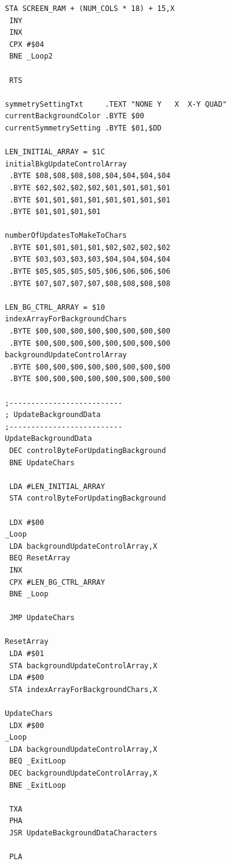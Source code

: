 \begin{minipage}[b]{0.33\linewidth}
\begin{lrbox}{\mybox}%
\begin{lstlisting}[basicstyle=\ttfamily\tiny]
 STA SCREEN_RAM + (NUM_COLS * 18) + 15,X
 INY 
 INX 
 CPX #$04
 BNE _Loop2

 RTS 

symmetrySettingTxt     .TEXT "NONE Y   X  X-Y QUAD"
currentBackgroundColor .BYTE $00
currentSymmetrySetting .BYTE $01,$DD

LEN_INITIAL_ARRAY = $1C
initialBkgUpdateControlArray   
 .BYTE $08,$08,$08,$08,$04,$04,$04,$04
 .BYTE $02,$02,$02,$02,$01,$01,$01,$01
 .BYTE $01,$01,$01,$01,$01,$01,$01,$01
 .BYTE $01,$01,$01,$01

numberOfUpdatesToMakeToChars   
 .BYTE $01,$01,$01,$01,$02,$02,$02,$02
 .BYTE $03,$03,$03,$03,$04,$04,$04,$04
 .BYTE $05,$05,$05,$05,$06,$06,$06,$06
 .BYTE $07,$07,$07,$07,$08,$08,$08,$08

LEN_BG_CTRL_ARRAY = $10
indexArrayForBackgroundChars   
 .BYTE $00,$00,$00,$00,$00,$00,$00,$00
 .BYTE $00,$00,$00,$00,$00,$00,$00,$00
backgroundUpdateControlArray   
 .BYTE $00,$00,$00,$00,$00,$00,$00,$00
 .BYTE $00,$00,$00,$00,$00,$00,$00,$00

;--------------------------
; UpdateBackgroundData
;--------------------------
UpdateBackgroundData
 DEC controlByteForUpdatingBackground
 BNE UpdateChars

 LDA #LEN_INITIAL_ARRAY
 STA controlByteForUpdatingBackground

 LDX #$00
_Loop
 LDA backgroundUpdateControlArray,X
 BEQ ResetArray
 INX 
 CPX #LEN_BG_CTRL_ARRAY
 BNE _Loop

 JMP UpdateChars

ResetArray
 LDA #$01
 STA backgroundUpdateControlArray,X
 LDA #$00
 STA indexArrayForBackgroundChars,X

UpdateChars
 LDX #$00
_Loop
 LDA backgroundUpdateControlArray,X
 BEQ _ExitLoop
 DEC backgroundUpdateControlArray,X
 BNE _ExitLoop

 TXA 
 PHA 
 JSR UpdateBackgroundDataCharacters

 PLA 
\end{lstlisting}
\end{lrbox}%
\scalebox{0.8}{\usebox{\mybox}}
\end{minipage}
\hspace{0.5cm}
